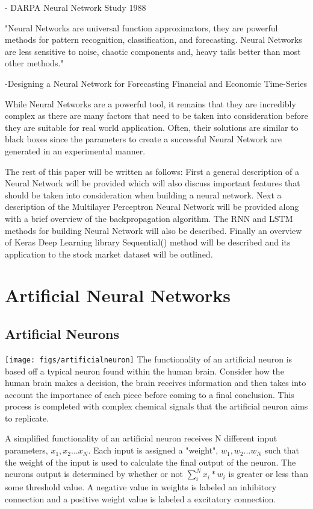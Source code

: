 \documentclass[twocolumn]{webofc}
\begin{document}
    - DARPA Neural Network Study 1988
    
    
"Neural Networks are universal function approximators, they are powerful methods for pattern recognition, classification, and forecasting. Neural Networks are less sensitive to noise, chaotic components and, heavy tails better than most other methods."

	-Designing a Neural Network for Forecasting Financial and Economic Time-Series
    
While Neural Networks are a powerful tool, it remains that they are incredibly complex as there are many factors that need to be taken into consideration before they are suitable for real world application. Often, their solutions are similar to black boxes since the parameters to create a successful Neural Network are generated in an experimental manner.



The rest of this paper will be written as follows: First a general description of a Neural Network will be provided which will also discuss important features that should be taken into consideration when building a neural network. Next a description of the Multilayer Perceptron Neural Network will be provided along with a brief overview of the backpropagation algorithm. The RNN and LSTM methods for building Neural Network will also be described. Finally an overview of Keras Deep Learning library Sequential() method will be described and its application to the stock market dataset will be outlined. 

\section{Artificial Neural Networks}\label{sec:ANN}

\subsection{Artificial Neurons}\label{sec:formatting}
\texttt{[image: figs/artificialneuron]}
The functionality of an artificial neuron is based off a typical neuron found within the human brain. Consider how the human brain makes a decision, the brain receives information and then takes into account the importance of each piece before coming to a final conclusion. This process is completed with complex chemical signals that the artificial neuron aims to replicate. 

 
A simplified functionality of an artificial neuron receives N different input parameters, $x_1, x_2... x_N$. Each input is assigned a "weight", $w_1,w_2...w_N$ such that the weight of the input is used to calculate the final output of the neuron. The neurons output is determined by whether or not $\sum_i^N x_i*w_i$ is greater or less than some threshold value. A negative value in weights is labeled an inhibitory connection and a positive weight value is labeled a excitatory connection. 
\end{document}
